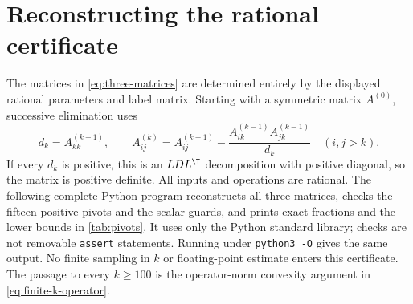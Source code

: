 \section{Reconstructing the rational certificate}\label{app:certificate}
The matrices in \eqref{eq:three-matrices} are determined entirely by the
displayed rational parameters and label matrix. Starting with a symmetric
matrix $A^{(0)}$, successive elimination uses
\[
 d_k=A^{(k-1)}_{kk},\qquad
 A^{(k)}_{ij}=A^{(k-1)}_{ij}
 -\frac{A^{(k-1)}_{ik}A^{(k-1)}_{jk}}{d_k}\quad(i,j>k).
\]
If every $d_k$ is positive, this is an $LDL^\T$ decomposition with positive
diagonal, so the matrix is positive definite. All inputs and operations
are rational. The following complete Python program reconstructs all
three matrices, checks the fifteen positive pivots and the scalar guards,
and prints exact fractions and the lower bounds in \cref{tab:pivots}.
It uses only the Python standard library; checks are not removable
\texttt{assert} statements. Running under \texttt{python3 -O} gives the
same output. No finite sampling in $k$ or floating-point estimate enters
this certificate. The passage to every $k\ge100$ is the operator-norm
convexity argument in \eqref{eq:finite-k-operator}.


